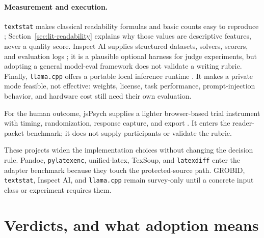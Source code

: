 \paragraph{Measurement and execution.} \texttt{textstat} makes classical
readability formulas and basic counts easy to reproduce \citep{textstat2026};
Section~\ref{sec:lit-readability} explains why those values are descriptive
features, never a quality score. Inspect AI supplies structured datasets,
solvers, scorers, and evaluation logs \citep{inspectai2026}; it is a plausible
optional harness for judge experiments, but adopting a general model-eval
framework does not validate a writing rubric. Finally, \texttt{llama.cpp}
offers a portable local inference runtime \citep{llamacpp2026}. It makes a
private mode feasible, not effective: weights, license, task performance,
prompt-injection behavior, and hardware cost still need their own evaluation.

For the human outcome, jsPsych supplies a lighter browser-based trial
instrument with timing, randomization, response capture, and export
\citep{jspsych2026}. It enters the reader-packet benchmark; it does not supply
participants or validate the rubric.

These projects widen the implementation choices without changing the decision
rule. Pandoc, \texttt{pylatexenc}, unified-latex, TexSoup, and
\texttt{latexdiff} enter the adapter
benchmark because they touch the protected-source path. GROBID,
\texttt{textstat}, Inspect AI, and \texttt{llama.cpp} remain survey-only until
a concrete input class or experiment requires them.

\section{Verdicts, and what adoption means}
\label{sec:oss-verdicts}

